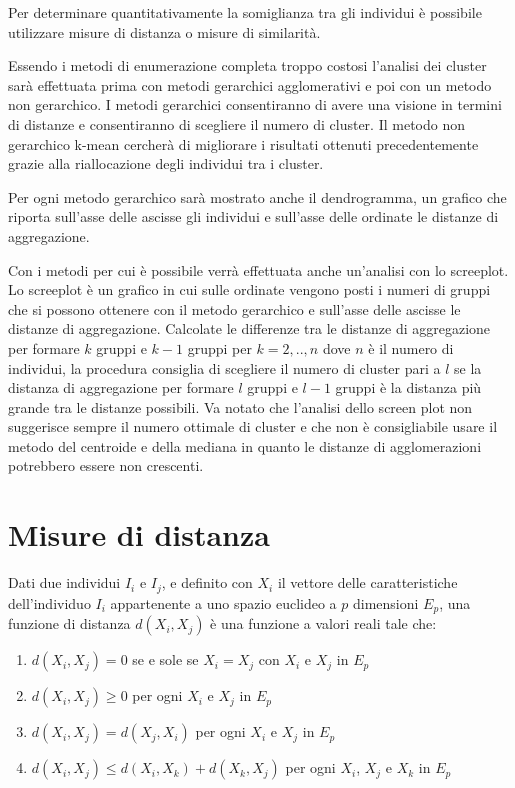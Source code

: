 \documentclass[]{book}
\providecommand{\tightlist}{%
  \setlength{\itemsep}{0pt}\setlength{\parskip}{0pt}}
\begin{document}
Per determinare quantitativamente la somiglianza tra gli individui è
possibile utilizzare misure di distanza o misure di similarità.

Essendo i metodi di enumerazione completa troppo costosi l'analisi dei
cluster sarà effettuata prima con metodi gerarchici agglomerativi e poi
con un metodo non gerarchico. I metodi gerarchici consentiranno di avere
una visione in termini di distanze e consentiranno di scegliere il
numero di cluster. Il metodo non gerarchico k-mean cercherà di
migliorare i risultati ottenuti precedentemente grazie alla
riallocazione degli individui tra i cluster.

Per ogni metodo gerarchico sarà mostrato anche il dendrogramma, un
grafico che riporta sull'asse delle ascisse gli individui e sull'asse
delle ordinate le distanze di aggregazione.

Con i metodi per cui è possibile verrà effettuata anche un'analisi con
lo screeplot. Lo screeplot è un grafico in cui sulle ordinate vengono
posti i numeri di gruppi che si possono ottenere con il metodo
gerarchico e sull'asse delle ascisse le distanze di aggregazione.
Calcolate le differenze tra le distanze di aggregazione per formare
\(k\) gruppi e \(k - 1\) gruppi per \(k = 2,..,n\) dove \(n\) è il
numero di individui, la procedura consiglia di scegliere il numero di
cluster pari a \(l\) se la distanza di aggregazione per formare \(l\)
gruppi e \(l - 1\) gruppi è la distanza più grande tra le distanze
possibili. Va notato che l'analisi dello screen plot non suggerisce
sempre il numero ottimale di cluster e che non è consigliabile usare il
metodo del centroide e della mediana in quanto le distanze di
agglomerazioni potrebbero essere non crescenti.

\section{Misure di distanza}\label{misure-di-distanza}

Dati due individui \(I_i\) e \(I_j\), e definito con \(X_i\) il vettore
delle caratteristiche dell'individuo \(I_i\) appartenente a uno spazio
euclideo a \(p\) dimensioni \(E_p\), una funzione di distanza
\(d(X_i,X_j)\) è una funzione a valori reali tale che:

\begin{enumerate}
\def\labelenumi{\arabic{enumi}.}
\tightlist
\item
  \(d(X_i,X_j)=0\) se e sole se \(X_i=X_j\) con \(X_i\) e \(X_j\) in
  \(E_p\)
\item
  \(d(X_i,X_j)\ge 0\) per ogni \(X_i\) e \(X_j\) in \(E_p\)
\item
  \(d(X_i,X_j)= d(X_j,X_i)\) per ogni \(X_i\) e \(X_j\) in \(E_p\)
\item
  \(d(X_i,X_j) \le d(X_i,X_k) + d(X_k,X_j)\) per ogni \(X_i\), \(X_j\) e
  \(X_k\) in \(E_p\)
\end{enumerate}
\end{document}
